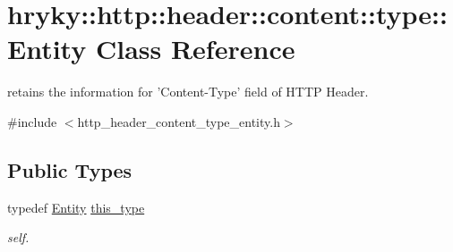 \hypertarget{classhryky_1_1http_1_1header_1_1content_1_1type_1_1_entity}{\section{hryky\-:\-:http\-:\-:header\-:\-:content\-:\-:type\-:\-:Entity Class Reference}
\label{classhryky_1_1http_1_1header_1_1content_1_1type_1_1_entity}
}


retains the information for 'Content-\/\-Type' field of H\-T\-T\-P Header.  




{\ttfamily \#include $<$http\-\_\-header\-\_\-content\-\_\-type\-\_\-entity.\-h$>$}

\subsection*{Public Types}
\begin{DoxyCompactItemize}
\item 
\hypertarget{classhryky_1_1http_1_1header_1_1content_1_1type_1_1_entity_aa4a0bbf1621298929fe4e74debe982b4}{typedef \hyperlink{classhryky_1_1http_1_1header_1_1content_1_1type_1_1_entity}{Entity} \hyperlink{classhryky_1_1http_1_1header_1_1content_1_1type_1_1_entity_aa4a0bbf1621298929fe4e74debe982b4}{this\-\_\-type}}\label{classhryky_1_1http_1_1header_1_1content_1_1type_1_1_entity_aa4a0bbf1621298929fe4e74debe982b4}

\begin{DoxyCompactList}\small\item\em self. \end{DoxyCompactList}\end{DoxyCompactItemize}
